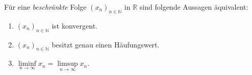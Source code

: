 Für eine \textit{beschränkte} Folge $(x_n)_{n \in \mathbb{N}}$ in $\mathbb{R}$ sind folgende Aussagen äquivalent:
\begin{enumerate}
    \item $(x_n)_{n \in \mathbb{N}}$ ist konvergent.
    \item $(x_n)_{n \in \mathbb{N}}$ besitzt genau einen Häufungswert.
    \item $\liminf\limits_{n \to \infty} x_n = \limsup\limits_{n \to \infty} x_n$.
\end{enumerate}